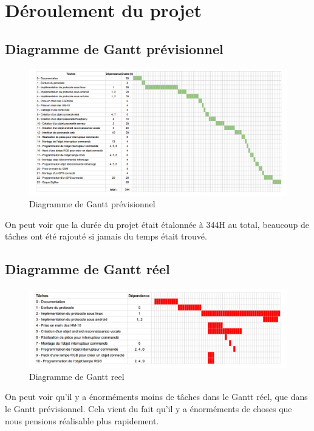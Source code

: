 \chapter{Déroulement du projet}

  \section{Diagramme de Gantt prévisionnel}

\begin{figure}[!ht]
         \centering
         \includegraphics[width=1.1\textwidth]{img/gantt_prev}
         \caption{Diagramme de Gantt prévisionnel}
         \label{Gantt_prev}
\end{figure}

On peut voir que la durée du projet était étalonnée à 344H au total, beaucoup de tâches ont été rajouté si 
jamais du temps était trouvé.

  \section{Diagramme de Gantt réel}
	
\begin{figure}[!ht]
         \centering
         \includegraphics[width=1.1\textwidth]{img/gantt_reel}
         \caption{Diagramme de Gantt reel}
         \label{Gantt_reel}
\end{figure}

On peut voir qu'il y a énorméments moins de tâches dans le Gantt réel, que dans le Gantt prévisionnel. Cela 
vient du fait qu'il y a énorméments de choses que nous pensions réalisable plus rapidement.



